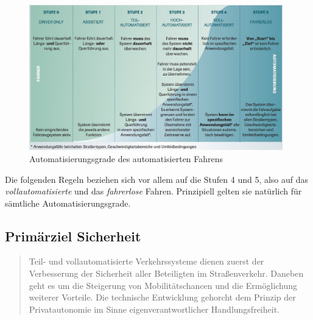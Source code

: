 \documentclass[twoside,a4paper,12pt]{article}
\begin{document}
\begin{figure}[H]
\centering
\includegraphics[width=11cm]{resources/uebersicht-stufen-der-automatisierung.jpg}
\caption[Automatisierungsgrade des automatisierten Fahrens]{Automatisierungsgrade des automatisierten Fahrens~\cite{vda}}
\label{figure:Automatisierungsgrade}
\end{figure}

Die folgenden Regeln beziehen sich vor allem auf die Stufen 4 und 5, also auf das \textit{vollautomatisierte} und das \textit{fahrerlose} Fahren.
Prinzipiell gelten sie natürlich für sämtliche Automatisierungsgrade.\\

\subsection{Primärziel Sicherheit} \label{PrimaerzielSicherheit}

\begin{quote}
\glqq
Teil- und vollautomatisierte Verkehrssysteme dienen zuerst der Verbesserung der Sicherheit aller Beteiligten im Straßenverkehr. 
Daneben geht es um die Steigerung von Mobilitätschancen und die Ermöglichung weiterer Vorteile. Die technische Entwicklung 
gehorcht dem Prinzip der Privatautonomie im Sinne eigenverantwortlicher Handlungsfreiheit.\grqq\mbox{~\cite[S. 10]{ek}}
\end{quote}
\end{document}
